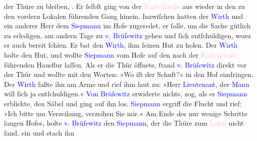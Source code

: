                der Thüre zu bleiben, . Er ſelbſt ging
               von der \textcolor{pink}{Kaiſerſtraße}{}\ledrightnote{\textcolor{pink}{Kaiserstraße}} aus wieder in den zu den
               vordern Lokalen führenden Gang hinein. Inzwiſchen hatten der \textcolor{blue}{Wirth}{} und ein anderer Herr dem \textcolor{blue}{Siepmann}{}\ledrightnote{\textcolor{blue}{Theodor Siepmann}} im Hofe zugeredet, er ſolle, um die
               Sache gütlich zu erledigen, am andern Tage zu \textcolor{blue}{v.
                  Brüſewitz}{}\ledrightnote{\textcolor{blue}{Henning von Brüsewitz}} gehen und ſich entſchuldigen, wozu er auch bereit ſchien. Er bat
               den \textcolor{blue}{Wirth}{}, ihm ſeinen Hut
               zu holen. Der \textcolor{blue}{Wirth}{} holte
               den Hut, und wollte \textcolor{blue}{Siepmann}{}\ledrightnote{\textcolor{blue}{Theodor Siepmann}} vom Hofe auf den
               nach der \textcolor{pink}{Kaiſerſtraße}{}\ledrightnote{\textcolor{pink}{Kaiserstraße}} führenden Hausflur
               laſſen. Als er die Thür öffnete, ſtand \textcolor{blue}{v.
                  Brüſewitz}{}\ledrightnote{\textcolor{blue}{Henning von Brüsewitz}} direkt vor der Thür und wollte mit den Worten: »Wo iſt der Schuft?«
               in den Hof eindringen. Der \textcolor{blue}{Wirth}{} faßte ihn am Arme und rief ihm laut zu: »Herr \textcolor{blue}{Lieutenant}{}, der \textcolor{blue}{Mann}{} will ſich ja entſchuldigen.« \textcolor{blue}{Von Brüſewitz}{}\ledrightnote{\textcolor{blue}{Henning von Brüsewitz}} erwiderte nichts, zog, als er
                  \textcolor{blue}{Siepmann}{}\ledrightnote{\textcolor{blue}{Theodor Siepmann}} erblickte, den Säbel und ging auf
               ihn los. \textcolor{blue}{Siepmann}{}\ledrightnote{\textcolor{blue}{Theodor Siepmann}} ergriff die Flucht und
               rief: »Ich bitte um Verzeihung, verzeihen Sie mir.« Am Ende des nur wenige Schritte
               langen Hofes, holte \textcolor{blue}{v. Brüſewitz}{}\ledrightnote{\textcolor{blue}{Henning von Brüsewitz}} den \textcolor{blue}{Siepmann,}{}\ledrightnote{\textcolor{blue}{Theodor Siepmann}} der die Thüre zum \textcolor{pink}{Lokal}{} nicht fand, ein und stach ihn
